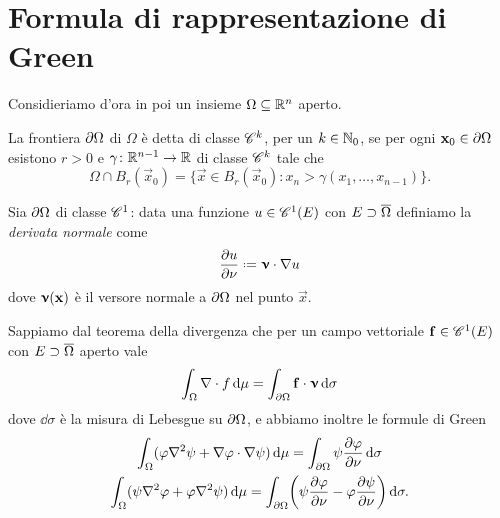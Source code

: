 \section{Formula di rappresentazione di Green}
Considieriamo d'ora in poi un insieme $\Omega\subseteq\R^n$ aperto.
\begin{definizione} \label{d:bordo-liscio}
    La frontiera $\boundary\Omega$ di $\Omega$ è detta di classe $\cclass[k]$, per un $k\in\N_0$, se per ogni $\vec x_0\in\boundary\Omega$ esistono $r>0$ e $\gamma\colon\R^{n-1}\to\R$ di classe $\cclass[k]$ tale che
    \begin{equation}
        \Omega\cap B_r(\vec x_0)=\{\vec x\in B_r(\vec x_0)\colon x_n>\gamma(x_1,\dotsc,x_{n-1})\}.
    \end{equation}
\end{definizione}
\begin{definizione} \label{d:derivata-normale}
    Sia $\boundary\Omega$ di classe $\cclass[1]$: data una funzione $u\in\cont[1]{E}$ con $E\supset\clos{\Omega}$ definiamo la \emph{derivata normale} come
    \begin{equation}
        \drp{u}{\nu}\defeq\scalar{\vnu}{\grad u}
        \label{eq:derivata-normale}
    \end{equation}
    dove $\vnu(\vec x)$ è il versore normale a $\boundary\Omega$ nel punto $\vec x$.
\end{definizione}
Sappiamo dal teorema della divergenza che per un campo vettoriale $\vec f\in\cont[1]{E}$ con $E\supset\clos{\Omega}$ aperto vale
\begin{equation}
    \int_\Omega\div f\,\dd\mu=\int_{\boundary\Omega} \scalar{\vec f}{\vnu}\,\dd\sigma
\end{equation}
dove $\dd\sigma$ è la misura di Lebesgue su $\boundary\Omega$, e abbiamo inoltre le formule di Green
\begin{gather}
    \int_\Omega (\phi\lap\psi+\scalar{\grad\phi}{\grad\psi})\,\dd\mu=\int_{\boundary\Omega} \psi\drp{\phi}{\nu}\,\dd\sigma \label{eq:green1}\\
    \int_\Omega (\psi\lap\phi+\phi\lap\psi)\,\dd\mu=\int_{\boundary\Omega} \biggl(\psi\drp{\phi}{\nu}-\phi\drp{\psi}{\nu}\biggr)\,\dd\sigma. \label{eq:green2}
\end{gather}

